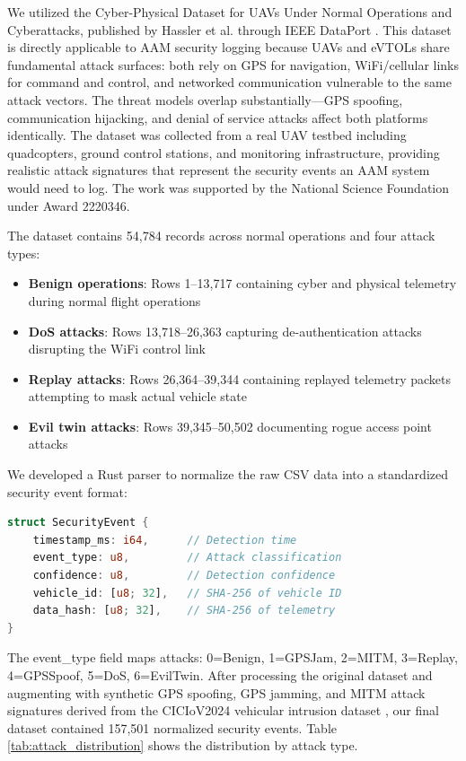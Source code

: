 \documentclass[conference]{IEEEtran}
\begin{document}
We utilized the Cyber-Physical Dataset for UAVs Under Normal Operations and Cyberattacks, published by Hassler et al. through IEEE DataPort \cite{hassler2023}. This dataset is directly applicable to AAM security logging because UAVs and eVTOLs share fundamental attack surfaces: both rely on GPS for navigation, WiFi/cellular links for command and control, and networked communication vulnerable to the same attack vectors. The threat models overlap substantially---GPS spoofing, communication hijacking, and denial of service attacks affect both platforms identically. The dataset was collected from a real UAV testbed including quadcopters, ground control stations, and monitoring infrastructure, providing realistic attack signatures that represent the security events an AAM system would need to log. The work was supported by the National Science Foundation under Award 2220346.

The dataset contains 54,784 records across normal operations and four attack types:
\begin{itemize}
\item \textbf{Benign operations}: Rows 1--13,717 containing cyber and physical telemetry during normal flight operations
\item \textbf{DoS attacks}: Rows 13,718--26,363 capturing de-authentication attacks disrupting the WiFi control link
\item \textbf{Replay attacks}: Rows 26,364--39,344 containing replayed telemetry packets attempting to mask actual vehicle state
\item \textbf{Evil twin attacks}: Rows 39,345--50,502 documenting rogue access point attacks
\end{itemize}

We developed a Rust parser to normalize the raw CSV data into a standardized security event format:

\begin{lstlisting}[language=Rust, caption={Security Event Data Structure}]
struct SecurityEvent {
    timestamp_ms: i64,      // Detection time
    event_type: u8,         // Attack classification
    confidence: u8,         // Detection confidence
    vehicle_id: [u8; 32],   // SHA-256 of vehicle ID
    data_hash: [u8; 32],    // SHA-256 of telemetry
}
\end{lstlisting}

The event\_type field maps attacks: 0=Benign, 1=GPSJam, 2=MITM, 3=Replay, 4=GPSSpoof, 5=DoS, 6=EvilTwin. After processing the original dataset and augmenting with synthetic GPS spoofing, GPS jamming, and MITM attack signatures derived from the CICIoV2024 vehicular intrusion dataset \cite{ciciov2024}, our final dataset contained 157,501 normalized security events. Table \ref{tab:attack_distribution} shows the distribution by attack type.
\end{document}
